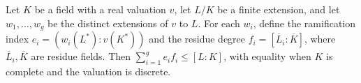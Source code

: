 Let $K$ be a field with a real valuation $v$, let $L/K$ be a finite extension, and let $w_1, \ldots, w_g$ be the distinct extensions of $v$ to $L$. For each $w_i$, define the ramification index $e_i = (w_i(L^*) : v(K^*))$ and the residue degree $f_i = [\overline{L}_i : \overline{K}]$, where $\overline{L}_i, \overline{K}$ are residue fields. Then $\sum_{i=1}^g e_i f_i \leq [L:K]$, with equality when $K$ is complete and the valuation is discrete.
